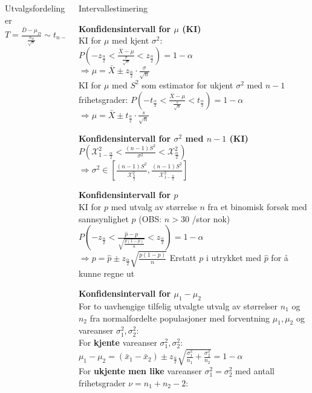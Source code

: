 \documentclass[final,hyperref={pdfpagelabels=false}]{beamer}
\newcommand{\tema}[2]{\footnotesize\raggedright\textbf{#1}\\{#2}\par}
\begin{document}
\begin{frame}{}
\begin{columns}[t]
\begin{column}{.25\linewidth}
\begin{block}{\center\normalsize Utvalgsfordelinger}
{					$T=\frac{\bar D - \mu_D}{\frac{S_D}{\sqrt n}}\sim t_{n-1}$
				}
			\end{block}
		\end{column}
		\begin{column}{.25\linewidth}
			\begin{block}{\center Intervallestimering}
				\tema{Konfidensintervall for $\mu$ (KI)}
				{KI for $\mu$ med kjent $\sigma^2$: \\
					$P\left( -z_{\frac{\alpha}{2}} < \frac{\bar X-\mu}{\frac{\sigma}{\sqrt{n}}} < z_{\frac{\alpha}{2}} \right) = 1-\alpha$\\
					$\Rightarrow \mu = \bar X \pm z_{\frac{\alpha}{2}} \cdot\frac{\sigma}{\sqrt{n}}$ \\
					KI for $\mu$ med $S^2$ som estimator for ukjent $\sigma^2$
					med $n-1$ frihetsgrader:
					$P\left( -t_{\frac{\alpha}{2}} < \frac{\bar X-\mu}{\frac{s}{\sqrt{n}}} < t_{\frac{\alpha}{2}} \right) = 1-\alpha $\\ $\Rightarrow \mu = \bar X \pm t_{\frac{\alpha}{2}} \cdot\frac{s}{\sqrt{n}}$ \\
				}
				\tema{Konfidensintervall for $\sigma^2$ med $n-1$ (KI)}
				{$P\left( \mathcal{X}^2_{1-\frac{\alpha}{2}} <\frac{(n-1)S^2}{\sigma^2} < \mathcal{X}^2_{\frac{\alpha}{2}} \right)$ \\
					$\Rightarrow \sigma^2 \in \left[ \frac{(n-1)S^2}{\mathcal{X}^2_{\frac{\alpha}{2}}}, \frac{(n-1)S^2}{\mathcal{X}^2_{1-\frac{\alpha}{2}}} \right]$
				}
				\tema{Konfidensintervall for $p$}
				{KI for $p$ med utvalg av størrelse $n$ fra et binomisk forsøk med sannsynlighet $p$ (OBS: $n>30$ /stor nok)
					$P\left( -z_{\frac{\alpha}{2}} < \frac{\hat p - p}{\sqrt{\frac{p(1-p)}{n}}} < z_{\frac{\alpha}{2}} \right) = 1 - \alpha$ \\ 
					$\Rightarrow p = \hat p \pm z_\frac{\alpha}{2} \sqrt{\frac{p(1-p)}{n}}$
					Erstatt $p$ i utrykket med $\hat p$ for å kunne regne ut\\
				}
				\tema{Konfidensintervall for $\mu_1 - \mu_2$}
				{For to uavhengige tilfelig utvalgte utvalg av størrelser $n_1$ og $n_2$ fra normalfordelte populasjoner med forventning $\mu_1, \mu_2$ og vareanser $\sigma_1^2, \sigma_2^2$: \\
					For \textbf{kjente} vareanser $\sigma_1^2, \sigma_2^2$: \\
					$\mu_1-\mu_2=(\bar x_1 - \bar x_2) \pm z_\frac{\alpha}{2}\sqrt{\frac{\sigma_1^2}{n_1}+\frac{\sigma_2^2}{n_2}}=1-\alpha$\\
					For \textbf{ukjente men like} vareanser $\sigma_1^2=\sigma_2^2$ med antall frihetsgrader $\nu = n_1 + n_2 - 2$:\\
}
\end{block}
\end{column}
\end{columns}
\end{frame}
\end{document}

